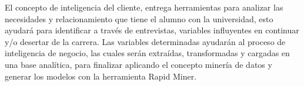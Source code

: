 El concepto de inteligencia del cliente, entrega herramientas para analizar las necesidades y relacionamiento que tiene el alumno con la universidad, esto ayudará para identificar a través de entrevistas, variables influyentes en continuar y/o desertar de la carrera. Las variables determinadas ayudarán al proceso de inteligencia de negocio, las cuales serán extraídas, transformadas y cargadas en una base analítica, para finalizar aplicando el concepto minería de datos y generar los modelos con la herramienta Rapid Miner.













